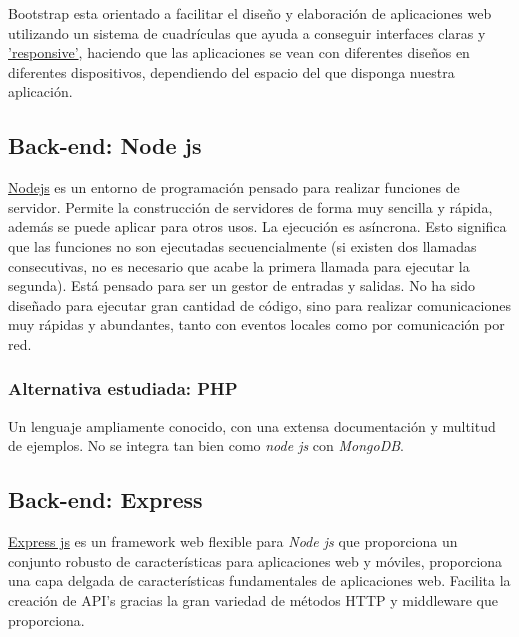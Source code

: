 Bootstrap esta orientado a facilitar el diseño y elaboración de aplicaciones web utilizando un sistema de cuadrículas que ayuda a conseguir interfaces claras y  \hyperlink{https://es.wikipedia.org/wiki/Diseño_web_adaptable}{'responsive'}, haciendo que las aplicaciones se vean con diferentes diseños en diferentes dispositivos, dependiendo del espacio del que disponga nuestra aplicación.


\subsection{Back-end: Node js}\label{tecnologias-nodejs}
\hyperlink{https://nodejs.org/}{Nodejs} es un entorno de programación pensado para realizar funciones de servidor. Permite la construcción de servidores de forma muy sencilla y rápida, además se puede aplicar para otros usos. La ejecución es asíncrona. Esto significa que las funciones no son ejecutadas secuencialmente (si existen dos llamadas consecutivas, no es necesario que acabe la primera llamada para ejecutar la segunda).
Está pensado para ser un gestor de entradas y salidas. No ha sido diseñado para ejecutar gran cantidad de código, sino para realizar comunicaciones muy rápidas y abundantes, tanto con eventos locales como por comunicación por red.


\subsubsection{Alternativa estudiada: PHP}\label{php}
Un lenguaje ampliamente conocido, con una extensa documentación y multitud de ejemplos. No se integra tan bien como \emph{node js} con \emph{MongoDB}. 



\subsection{Back-end: Express }\label{tecnologias-expressjs}
\hyperlink{http://expressjs.com/}{Express js} es un framework web flexible para \emph{Node js} que proporciona un conjunto robusto de características para aplicaciones web y móviles, proporciona una capa delgada de características fundamentales de aplicaciones web. Facilita la creación de API’s gracias la gran variedad de métodos HTTP y middleware que proporciona.



